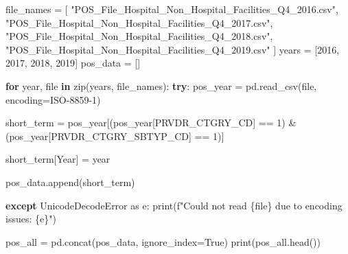 \documentclass[
  letterpaper,
  DIV=11,
  numbers=noendperiod]{scrartcl}
\newenvironment{Shaded}{\begin{snugshade}}{\end{snugshade}}
\newcommand{\BuiltInTok}[1]{\textcolor[rgb]{0.00,0.23,0.31}{#1}}
\newcommand{\ControlFlowTok}[1]{\textcolor[rgb]{0.00,0.23,0.31}{\textbf{#1}}}
\newcommand{\DecValTok}[1]{\textcolor[rgb]{0.68,0.00,0.00}{#1}}
\newcommand{\ImportTok}[1]{\textcolor[rgb]{0.00,0.46,0.62}{#1}}
\newcommand{\KeywordTok}[1]{\textcolor[rgb]{0.00,0.23,0.31}{\textbf{#1}}}
\newcommand{\NormalTok}[1]{\textcolor[rgb]{0.00,0.23,0.31}{#1}}
\newcommand{\OperatorTok}[1]{\textcolor[rgb]{0.37,0.37,0.37}{#1}}
\newcommand{\PreprocessorTok}[1]{\textcolor[rgb]{0.68,0.00,0.00}{#1}}
\newcommand{\SpecialCharTok}[1]{\textcolor[rgb]{0.37,0.37,0.37}{#1}}
\newcommand{\SpecialStringTok}[1]{\textcolor[rgb]{0.13,0.47,0.30}{#1}}
\newcommand{\StringTok}[1]{\textcolor[rgb]{0.13,0.47,0.30}{#1}}
\newcommand{\VariableTok}[1]{\textcolor[rgb]{0.07,0.07,0.07}{#1}}
\begin{document}
\begin{Shaded}
\begin{Highlighting}[]
\NormalTok{file\_names }\OperatorTok{=}\NormalTok{ [}
    \StringTok{"POS\_File\_Hospital\_Non\_Hospital\_Facilities\_Q4\_2016.csv"}\NormalTok{,}
    \StringTok{"POS\_File\_Hospital\_Non\_Hospital\_Facilities\_Q4\_2017.csv"}\NormalTok{,}
    \StringTok{"POS\_File\_Hospital\_Non\_Hospital\_Facilities\_Q4\_2018.csv"}\NormalTok{,}
    \StringTok{"POS\_File\_Hospital\_Non\_Hospital\_Facilities\_Q4\_2019.csv"}
\NormalTok{]}
\NormalTok{years }\OperatorTok{=}\NormalTok{ [}\DecValTok{2016}\NormalTok{, }\DecValTok{2017}\NormalTok{, }\DecValTok{2018}\NormalTok{, }\DecValTok{2019}\NormalTok{]}
\NormalTok{pos\_data }\OperatorTok{=}\NormalTok{ []}

\ControlFlowTok{for}\NormalTok{ year, }\BuiltInTok{file} \KeywordTok{in} \BuiltInTok{zip}\NormalTok{(years, file\_names):}
    \ControlFlowTok{try}\NormalTok{:}
\NormalTok{        pos\_year }\OperatorTok{=}\NormalTok{ pd.read\_csv(}\BuiltInTok{file}\NormalTok{, encoding}\OperatorTok{=}\StringTok{\textquotesingle{}ISO{-}8859{-}1\textquotesingle{}}\NormalTok{)}
        
\NormalTok{        short\_term }\OperatorTok{=}\NormalTok{ pos\_year[(pos\_year[}\StringTok{\textquotesingle{}PRVDR\_CTGRY\_CD\textquotesingle{}}\NormalTok{] }\OperatorTok{==} \DecValTok{1}\NormalTok{) }\OperatorTok{\&} 
\NormalTok{                              (pos\_year[}\StringTok{\textquotesingle{}PRVDR\_CTGRY\_SBTYP\_CD\textquotesingle{}}\NormalTok{] }\OperatorTok{==} \DecValTok{1}\NormalTok{)]}
        
\NormalTok{        short\_term[}\StringTok{\textquotesingle{}Year\textquotesingle{}}\NormalTok{] }\OperatorTok{=}\NormalTok{ year}
        
\NormalTok{        pos\_data.append(short\_term)}
    
    \ControlFlowTok{except} \PreprocessorTok{UnicodeDecodeError} \ImportTok{as}\NormalTok{ e:}
        \BuiltInTok{print}\NormalTok{(}\SpecialStringTok{f"Could not read }\SpecialCharTok{\{}\BuiltInTok{file}\SpecialCharTok{\}}\SpecialStringTok{ due to encoding issues: }\SpecialCharTok{\{}\NormalTok{e}\SpecialCharTok{\}}\SpecialStringTok{"}\NormalTok{)}

\NormalTok{pos\_all }\OperatorTok{=}\NormalTok{ pd.concat(pos\_data, ignore\_index}\OperatorTok{=}\VariableTok{True}\NormalTok{)}
\BuiltInTok{print}\NormalTok{(pos\_all.head())}
\end{Highlighting}
\end{Shaded}
\end{document}
